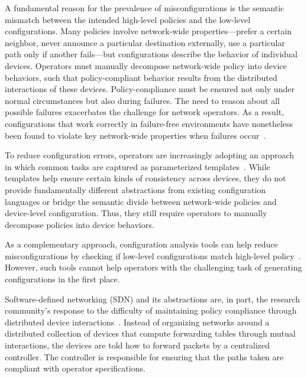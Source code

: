 \documentclass[10pt]{sigalternate052015}
\begin{document}
A fundamental reason for the prevalence of misconfigurations is the
semantic mismatch between the intended high-level
policies and the low-level configurations.
Many policies involve network-wide properties---prefer a certain neighbor,
never announce a particular destination externally,
use a particular path only if another fails---but configurations describe the behavior of
individual devices.
%
Operators must manually decompose network-wide policy into
device behaviors, such that policy-compliant behavior results from the distributed interactions of
these devices.
%
Policy-compliance must be ensured not only under normal
circumstances but also during failures.  The need to reason
about all possible failures exacerbates the challenge
for network operators.  As a result, configurations that work
correctly in failure-free environments have nonetheless been found to violate key
network-wide properties when failures occur~\cite{batfish}.

To reduce configuration errors, operators are increasingly adopting an
approach in which common tasks are captured as parameterized templates~\cite{hatch,thwack}.
%
%
While templates help ensure certain kinds of consistency across devices,
they do not provide fundamentally different abstractions from existing configuration languages
or bridge the semantic divide between network-wide policies and device-level configuration.
Thus, they still require operators to
manually decompose policies into device behaviors.

As a complementary approach, configuration analysis tools can help reduce misconfigurations by checking if low-level configurations match high-level policy~\cite{batfish,feamster+:rcc}. However, such tools cannot help operators with the challenging task of generating configurations in the first place.


Software-defined networking (SDN) and its abstractions
are, in part, the research
community's response to the difficulty of maintaining policy
compliance through distributed device interactions~\cite{ethane}.
Instead of organizing networks around a distributed
collection of devices that compute forwarding tables through
mutual interactions, the devices are told how to
forward packets by a centralized controller. The controller is responsible for ensuring that the
paths taken are compliant with operator specifications.
\end{document}
